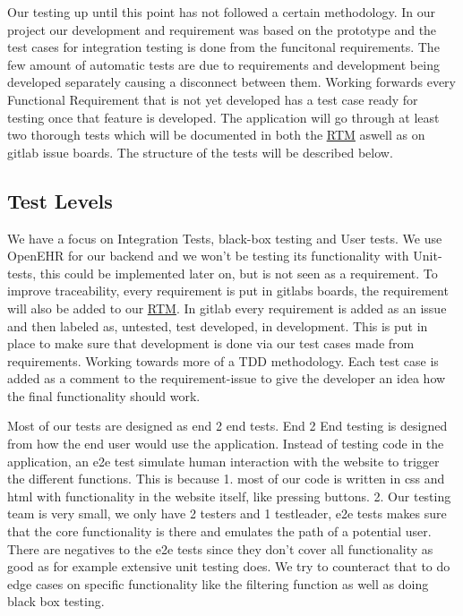 Our testing up until this point has not followed a certain methodology. In our project our development and requirement was based on the prototype and the test cases for integration testing is done from the funcitonal requirements. The few amount of automatic tests are due to requirements and development being developed separately causing a disconnect between them. Working forwards every Functional Requirement that is not yet developed has a test case ready for testing once that feature is developed. The application will go through at least two thorough tests which will be documented in both the \href{https://gitlab.liu.se/tddc88-company-3-2020/deploy/-/tree/Document_branch/RTM}{\underline RTM} aswell as on gitlab issue boards. The structure of the tests will be described below.

\subsection{Test Levels}
We have a focus on Integration Tests, black-box testing and User tests. We use OpenEHR for our backend and we won't be testing its functionality with Unit-tests, this could be implemented later on, but is not seen as a requirement. To improve traceability, every requirement is put in gitlabs boards, the requirement will also be added to our \href{https://gitlab.liu.se/tddc88-company-3-2020/deploy/-/tree/Document_branch/RTM}{\underline RTM}. In gitlab every requirement is added as an issue and then labeled as, untested, test developed, in development. This is put in place to make sure that development is done via our test cases made from requirements. Working towards more of a TDD methodology. Each test case is added as a comment to the requirement-issue to give the developer an idea how the final functionality should work.



Most of our tests are designed as end 2 end tests. End 2 End testing is designed from how the end user would use the application. Instead of testing code in the application, an e2e test simulate human interaction with the website to trigger the different functions. This is because 1. most of our code is written in css and html with functionality in the website itself, like pressing buttons. 2. Our testing team is very small, we only have 2 testers and 1 testleader, e2e tests makes sure that the core functionality is there and emulates the path of a potential user. There are negatives to the e2e tests since they don't cover all functionality as good as for example extensive unit testing does. We try to counteract that to do edge cases on specific functionality like the filtering function as well as doing black box testing.

